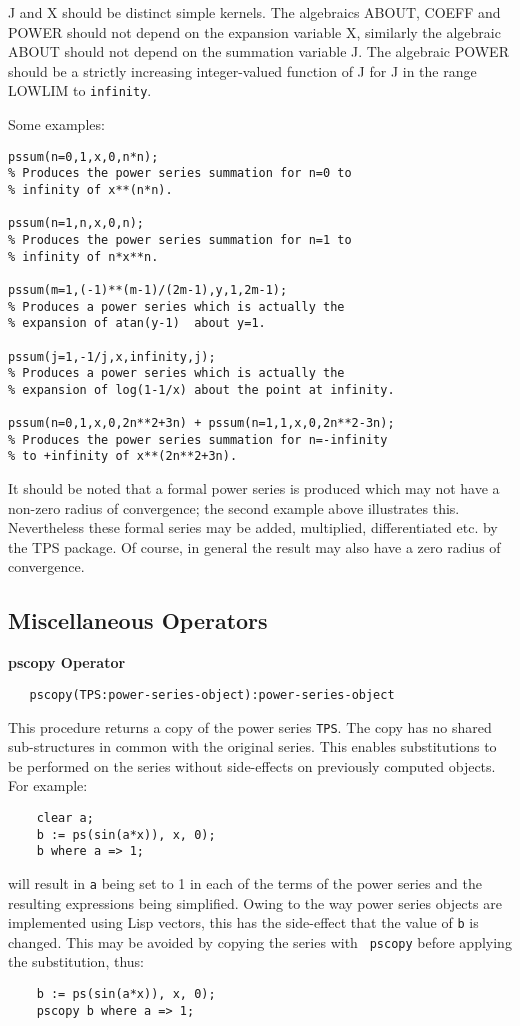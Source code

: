 J and X should be distinct simple kernels. The algebraics
ABOUT,  COEFF and POWER should not depend on the
expansion variable X, similarly the algebraic ABOUT should
not depend on the summation variable J.  The algebraic POWER should be
a strictly increasing integer-valued function of J for J in the range
LOWLIM to \texttt{infinity}.

Some examples:
\begin{verbatim}
pssum(n=0,1,x,0,n*n);
% Produces the power series summation for n=0 to
% infinity of x**(n*n).

pssum(n=1,n,x,0,n);
% Produces the power series summation for n=1 to
% infinity of n*x**n.

pssum(m=1,(-1)**(m-1)/(2m-1),y,1,2m-1);
% Produces a power series which is actually the
% expansion of atan(y-1)  about y=1.

pssum(j=1,-1/j,x,infinity,j);
% Produces a power series which is actually the
% expansion of log(1-1/x) about the point at infinity.

pssum(n=0,1,x,0,2n**2+3n) + pssum(n=1,1,x,0,2n**2-3n);
% Produces the power series summation for n=-infinity
% to +infinity of x**(2n**2+3n).
\end{verbatim}
It should be noted that a formal power series is produced which may not have
a non-zero radius of convergence; the second example above illustrates this.
Nevertheless these formal series may be added, multiplied, differentiated etc.
by the TPS package. Of course, in general the result may also have a zero radius
of convergence.

\subsection{Miscellaneous Operators}

\textbf{pscopy Operator}
\hypertarget{operator:PSCOPY}{}
\begin{verbatim}
   pscopy(TPS:power-series-object):power-series-object
\end{verbatim}
This procedure returns a copy of the power series \texttt{TPS}. 
The copy has no shared sub-structures in common with the original
 series.  This enables substitutions to be performed on the series
 without side-effects on previously computed objects. For example:
\begin{verbatim}
    clear a;
    b := ps(sin(a*x)), x, 0);
    b where a => 1;
\end{verbatim}

will result in \texttt{a} being set to 1 in each of the terms of the
power series and the resulting expressions being simplified. Owing to
the way power series objects are implemented using Lisp vectors, this
has the side-effect that the value of \texttt{b} is changed.  This may be
avoided by copying the series with \texttt{ pscopy} before applying the
substitution, thus:
\begin{verbatim}
    b := ps(sin(a*x)), x, 0);
    pscopy b where a => 1;
\end{verbatim}

